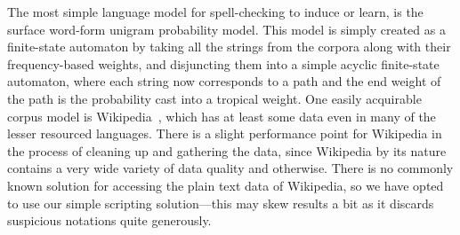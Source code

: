 \documentclass[a4paper,12pt]{article}
\begin{document}
The most simple language model for spell-checking to induce or learn, is
the surface word-form unigram probability model. This model is simply created
as a finite-state automaton by taking all the strings from the corpora along
with their frequency-based weights, and disjuncting them into a simple acyclic
finite-state automaton, where each string now corresponds to a path and the end
weight of the path is the probability cast into a tropical weight. One easily
acquirable corpus model is Wikipedia~\cite[]{pirinen/2010/lrec}, which has at
least some data even in many of the lesser resourced languages. There is a
slight performance point for Wikipedia in the process of cleaning up and
gathering the data, since Wikipedia by its nature contains a very wide variety
of data quality and otherwise. There is no commonly known solution for
accessing the plain text data of Wikipedia, so we have opted to use our
simple scripting solution---this may skew results a bit as it discards
suspicious notations quite generously.
\end{document}
